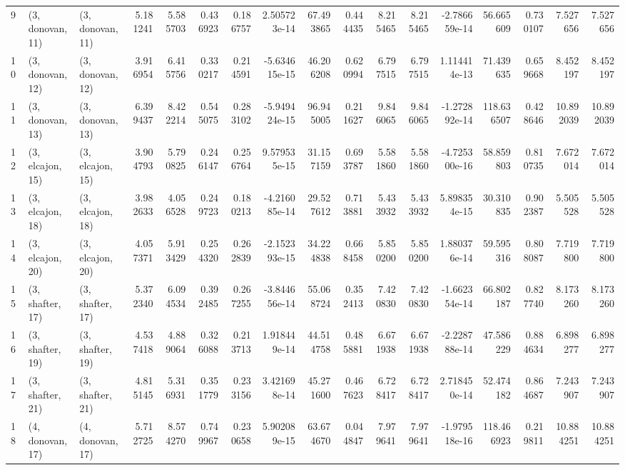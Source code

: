 \begin{tabular}{lllrrrrrrrrrrrrrr}
9  &  (3, donovan, 11) &  (3, donovan, 11) &  5.181241 &  5.585703 &   0.436923 &  0.186757 &  2.505723e-14 &   67.493865 &  0.444435 &   8.215465 &   8.215465 & -2.786659e-14 &   56.665609 &  0.730107 &   7.527656 &   7.527656 \\
10 &  (3, donovan, 12) &  (3, donovan, 12) &  3.916954 &  6.415756 &   0.330217 &  0.214591 & -5.634615e-15 &   46.206208 &  0.620994 &   6.797515 &   6.797515 &  1.114414e-13 &   71.439635 &  0.659668 &   8.452197 &   8.452197 \\
11 &  (3, donovan, 13) &  (3, donovan, 13) &  6.399437 &  8.422214 &   0.545075 &  0.283102 & -5.949424e-15 &   96.945005 &  0.211627 &   9.846065 &   9.846065 & -1.272892e-14 &  118.636507 &  0.428646 &  10.892039 &  10.892039 \\
12 &  (3, elcajon, 15) &  (3, elcajon, 15) &  3.904793 &  5.790825 &   0.246147 &  0.256764 &  9.579535e-15 &   31.157159 &  0.693787 &   5.581860 &   5.581860 & -4.725300e-16 &   58.859803 &  0.810735 &   7.672014 &   7.672014 \\
13 &  (3, elcajon, 18) &  (3, elcajon, 18) &  3.982633 &  4.056528 &   0.249723 &  0.180213 & -4.216085e-14 &   29.527612 &  0.713881 &   5.433932 &   5.433932 &  5.898354e-15 &   30.310835 &  0.902387 &   5.505528 &   5.505528 \\
14 &  (3, elcajon, 20) &  (3, elcajon, 20) &  4.057371 &  5.913429 &   0.254320 &  0.262839 & -2.152393e-15 &   34.224838 &  0.668458 &   5.850200 &   5.850200 &  1.880376e-14 &   59.595316 &  0.808087 &   7.719800 &   7.719800 \\
15 &  (3, shafter, 17) &  (3, shafter, 17) &  5.372340 &  6.094534 &   0.392485 &  0.267255 & -3.844656e-14 &   55.068724 &  0.352413 &   7.420830 &   7.420830 & -1.662354e-14 &   66.802187 &  0.827740 &   8.173260 &   8.173260 \\
16 &  (3, shafter, 19) &  (3, shafter, 19) &  4.537418 &  4.889064 &   0.326088 &  0.213713 &  1.918449e-14 &   44.514758 &  0.485881 &   6.671938 &   6.671938 & -2.228788e-14 &   47.586229 &  0.884634 &   6.898277 &   6.898277 \\
17 &  (3, shafter, 21) &  (3, shafter, 21) &  4.815145 &  5.316931 &   0.351779 &  0.233156 &  3.421698e-14 &   45.271600 &  0.467623 &   6.728417 &   6.728417 &  2.718450e-14 &   52.474182 &  0.864687 &   7.243907 &   7.243907 \\
18 &  (4, donovan, 17) &  (4, donovan, 17) &  5.712725 &  8.574270 &   0.749967 &  0.230658 &  5.902089e-15 &   63.674670 &  0.044847 &   7.979641 &   7.979641 & -1.979518e-16 &  118.466923 &  0.219811 &  10.884251 &  10.884251 \\

\end{tabular}
